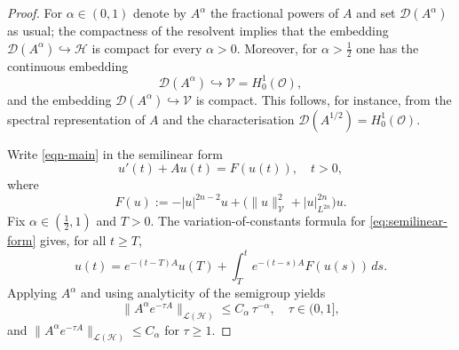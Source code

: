 \documentclass[reqno]{amsart}
\begin{document}
\begin{proof}
 For $\alpha\in(0,1)$ denote by $A^\alpha$ the fractional
powers of $A$ and set $\mathcal D(A^\alpha)$ as usual; the compactness of the resolvent
implies that the embedding $\mathcal D(A^\alpha)\hookrightarrow \mathcal H$ is
compact for every $\alpha>0$.
Moreover, for $\alpha>\frac12$ one has the continuous embedding
\begin{equation}\label{eq:Dalpha-to-V}
\mathcal D(A^\alpha)\hookrightarrow \mathcal V=H_0^1(\mathcal O),
\end{equation}
and the embedding $\mathcal D(A^\alpha)\hookrightarrow \mathcal V$ is compact.
This follows, for
instance, from the spectral representation of $A$ and the characterisation
$\mathcal D(A^{1/2})=H_0^1(\mathcal O)$.

Write \eqref{eqn-main} in the semilinear form
\begin{equation}\label{eq:semilinear-form}
u'(t)+A u(t)=F(u(t)),\quad t>0,
\end{equation}
where
\[
F(u):= -|u|^{2n-2}u + \bigl(\|u\|_{\mathcal V}^{2}+|u|_{L^{2n}}^{2n}\bigr)u.
\]
Fix $\alpha\in(\tfrac12,1)$ and $T>0$. The variation-of-constants formula for
\eqref{eq:semilinear-form} gives, for all $t\ge T$,
\begin{equation}\label{eq:variation-constants-shift}
u(t)=e^{-(t-T)A}u(T)+\int_T^{t} e^{-(t-s)A}F(u(s))\,ds.
\end{equation}
Applying $A^\alpha$ and using analyticity of the semigroup yields
\begin{equation}\label{eq:smoothing-est}
\|A^\alpha e^{-\tau A}\|_{\mathcal L(\mathcal H)}
\le C_\alpha\,\tau^{-\alpha},\quad \tau\in(0,1],
\end{equation}
and $\|A^\alpha e^{-\tau A}\|_{\mathcal L(\mathcal H)}\le C_\alpha$ for $\tau\ge 1$.


\end{proof}
\end{document}
